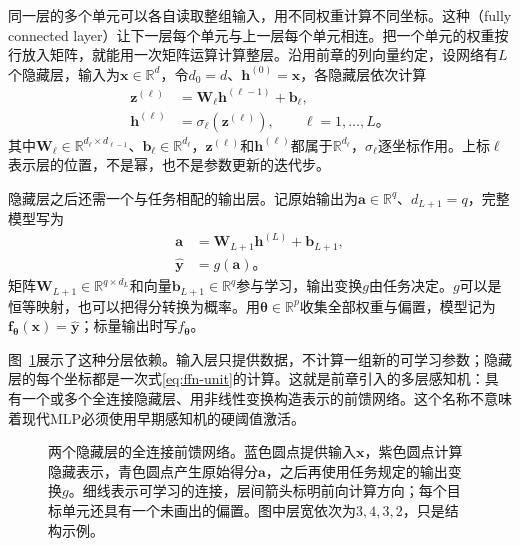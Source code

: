 同一层的多个单元可以各自读取整组输入，用不同权重计算不同坐标。这种（fully connected layer）让下一层每个单元与上一层每个单元相连。把一个单元的权重按行放入矩阵，就能用一次矩阵运算计算整层。沿用前章的列向量约定，设网络有$L$个隐藏层，输入为$\bm{x}\in\mathbb{R}^{d}$，令$d_0=d$、$\bm{h}^{(0)}=\bm{x}$，各隐藏层依次计算
\begin{equation}
  \begin{aligned}
    \bm{z}^{(\ell)}
      &=\bm{W}_\ell\bm{h}^{(\ell-1)}+\bm{b}_\ell,\\
    \bm{h}^{(\ell)}&=\sigma_\ell\!\left(\bm{z}^{(\ell)}\right),
    \qquad \ell=1,\ldots,L\text{。}
  \end{aligned}
  \label{eq:ffn-hidden-layers}
\end{equation}
其中$\bm{W}_\ell\in\mathbb{R}^{d_\ell\times d_{\ell-1}}$、$\bm{b}_\ell\in\mathbb{R}^{d_\ell}$，$\bm{z}^{(\ell)}$和$\bm{h}^{(\ell)}$都属于$\mathbb{R}^{d_\ell}$，$\sigma_\ell$逐坐标作用。上标$\ell$表示层的位置，不是幂，也不是参数更新的迭代步。

隐藏层之后还需一个与任务相配的输出层。记原始输出为$\bm{a}\in\mathbb{R}^{q}$、$d_{L+1}=q$，完整模型写为
\begin{equation}
  \begin{aligned}
    \bm{a}&=\bm{W}_{L+1}\bm{h}^{(L)}+\bm{b}_{L+1},\\
    \widehat{\bm{y}}&=g(\bm{a})\text{。}
  \end{aligned}
  \label{eq:ffn-output-map}
\end{equation}
矩阵$\bm{W}_{L+1}\in\mathbb{R}^{q\times d_L}$和向量$\bm{b}_{L+1}\in\mathbb{R}^{q}$参与学习，输出变换$g$由任务决定。$g$可以是恒等映射，也可以把得分转换为概率。用$\bm{\theta}\in\mathbb{R}^{p}$收集全部权重与偏置，模型记为$\bm{f}_{\bm{\theta}}(\bm{x})=\widehat{\bm{y}}$；标量输出时写$f_{\bm{\theta}}$。

图~\ref{fig:ffn-architecture}展示了这种分层依赖。输入层只提供数据，不计算一组新的可学习参数；隐藏层的每个坐标都是一次式\eqref{eq:ffn-unit}的计算。这就是前章引入的多层感知机：具有一个或多个全连接隐藏层、用非线性变换构造表示的前馈网络。这个名称不意味着现代MLP必须使用早期感知机的硬阈值激活。

\begin{figure}[htb]
  \centering
  
  \caption{两个隐藏层的全连接前馈网络。蓝色圆点提供输入$\bm{x}$，紫色圆点计算隐藏表示，青色圆点产生原始得分$\bm{a}$，之后再使用任务规定的输出变换$g$。细线表示可学习的连接，层间箭头标明前向计算方向；每个目标单元还具有一个未画出的偏置。图中层宽依次为$3,4,3,2$，只是结构示例。}
  \label{fig:ffn-architecture}
\end{figure}

